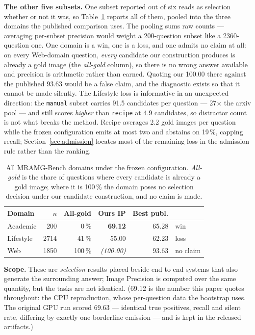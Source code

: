 \documentclass[journal]{IEEEtran}
\begin{document}
\textbf{The other five subsets.} One subset reported out of six reads as
selection whether or not it was, so Table~\ref{tab:mramg-all} reports all of
them, pooled into the three domains the published comparison uses. The pooling
sums raw counts --- averaging per-subset precision would weight a 200-question
subset like a 2360-question one. One domain is a win, one is a loss, and one
admits no claim at all: on every Web-domain question, \emph{every} candidate our
construction produces is already a gold image (the \emph{all-gold} column), so
there is no wrong answer available and precision is arithmetic rather than
earned. Quoting our 100.00 there against the published 93.63 would be a false
claim, and the diagnostic exists so that it cannot be made silently. The
Lifestyle loss is informative in an unexpected direction: the \texttt{manual}
subset carries 91.5 candidates per question --- 27$\times$ the arxiv pool ---
and still scores \emph{higher} than \texttt{recipe} at 4.9 candidates, so
distractor count is not what breaks the method. Recipe averages 2.2 gold images
per question while the frozen configuration emits at most two and abstains on
19\,\%, capping recall; Section~\ref{sec:admission} locates most of the
remaining loss in the admission rule rather than the ranking.

\begin{table}[t]
\caption{All MRAMG-Bench domains under the frozen configuration.
\emph{All-gold} is the share of questions where every candidate is already a
gold image; where it is 100\,\% the domain poses no selection decision under our
candidate construction, and no claim is made.}
\label{tab:mramg-all}
\centering
\begin{tabular}{@{}lrrrrl@{}}
\toprule
Domain & $n$ & All-gold & Ours IP & Best publ. & \\
\midrule
Academic & 200 & 0\,\% & \textbf{69.12} & 65.28 & win \\
Lifestyle & 2714 & 41\,\% & 55.00 & 62.23 & loss \\
Web & 1850 & 100\,\% & \emph{(100.00)} & 93.63 & no claim \\
\bottomrule
\end{tabular}
\end{table}

\textbf{Scope.} These are \emph{selection} results placed beside end-to-end
systems that also generate the surrounding answer; Image Precision is computed
over the same quantity, but the tasks are not identical. (69.12 is the number this
paper quotes throughout: the CPU reproduction, whose per-question data the
bootstrap uses. The original GPU run scored 69.63 --- identical true
positives, recall and silent rate, differing by exactly one borderline
emission --- and is kept in the released artifacts.)
\end{document}

